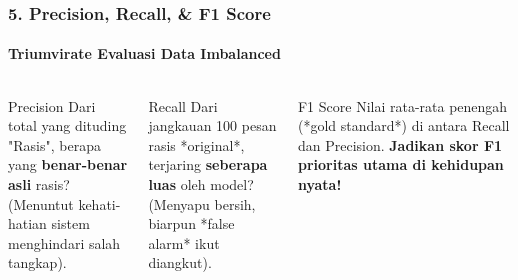 \documentclass[t,aspectratio=169,xcolor=dvipsnames]{beamer}
\begin{document}
\begin{frame}
    \frametitle{5. Precision, Recall, \& F1 Score}
    \framesubtitle{Triumvirate Evaluasi Data Imbalanced}
    \scriptsize
    \begin{columns}[T]
        \begin{block}{Precision}
            Dari total yang dituding "Rasis", berapa yang \textbf{benar-benar asli} rasis?\\
            \vspace{0.1cm}
            (Menuntut kehati-hatian sistem menghindari salah tangkap).
        \end{block}

        \begin{block}{Recall}
            Dari jangkauan 100 pesan rasis *original*, terjaring \textbf{seberapa luas} oleh model?\\
            \vspace{0.1cm}
            (Menyapu bersih, biarpun *false alarm* ikut diangkut).
        \end{block}
        
        \begin{alertblock}{F1 Score}
            Nilai rata-rata penengah (*gold standard*) di antara Recall dan Precision. \textbf{Jadikan skor F1 prioritas utama di kehidupan nyata!}
        \end{alertblock}
    \end{columns}
\end{frame}
\end{document}
